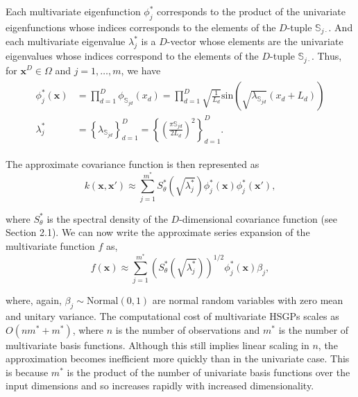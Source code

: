\documentclass[]{interact}
\theoremstyle{plain}%
\theoremstyle{definition}
\theoremstyle{remark}
\begin{document}
Each multivariate eigenfunction $\phi^{\ast}_j$ corresponds to the product of the univariate eigenfunctions whose indices corresponds to the elements of the $D$-tuple $\mathbb{S}_{j\cdotp}$. And each multivariate eigenvalue $\lambda^{\ast}_j$ is a $D$-vector whose elements are the univariate eigenvalues whose indices correspond to the elements of the $D$-tuple $\mathbb{S}_{j\cdotp}$. Thus, for $\mathbf{x}^D \in \Omega$ and $j=1,\ldots,m$, we have 
%
\begin{align} \label{bf&lambda_multi}
\begin{split}
\phi^{\ast}_j(\mathbf{x}) &= \prod_{d=1}^{D} \phi_{\mathbb{S}_{jd}}(x_d) = \prod_{d=1}^{D} \sqrt{\frac{1}{L_d}} \text{sin}\left(\sqrt{\lambda_{\mathbb{S}_{jd}}}(x_d+L_d)\right) \\
%
\lambda^{\ast}_j &= \left\{ \lambda_{\mathbb{S}_{jd}} \right\}_{d=1}^D =  \left\{ \left(\tfrac{\pi \mathbb{S}_{jd}}{2L_d}\right)^2 \right\}_{d=1}^D. 
\end{split}
\end{align}

\noindent The approximate covariance function is then represented as
%
\begin{equation}\label{approxcov_multi}
k(\mathbf{x},\mathbf{x}') \approx \sum_{j=1}^{m^{\ast}} 
S^{\ast}_{\theta}\left(\sqrt{\lambda^{\ast}_j}\right)
\phi^{\ast}_j(\mathbf{x}) \phi^{\ast}_j(\mathbf{x}'),
\end{equation}

\noindent where $S^{\ast}_{\theta}$ is the spectral density of the $D$-dimensional covariance function (see Section 2.1). We can now write the approximate series expansion of the multivariate function $f$ as,
%
\begin{equation}\label{approxf}
f(\mathbf{x}) \approx \sum_{j=1}^{m^{\ast}} 
\left( S^{\ast}_{\theta} \left(\sqrt{\lambda^{\ast}_j} \right)\right)^{1/2}
\phi^{\ast}_j(\mathbf{x}) \beta_j, 
\end{equation}

\noindent where, again, $\beta_j \sim \text{Normal}(0,1)$ are normal random variables with zero mean and unitary variance. The computational cost of multivariate HSGPs scales as $O(n m^{\ast} + m^{\ast})$, where $n$ is the number of observations and $m^{\ast}$ is the number of multivariate basis functions. Although this still implies linear scaling in $n$, the approximation becomes inefficient more quickly than in the univariate case. This is because $m^{\ast}$ is the product of the number of univariate basis functions over the input dimensions and so increases rapidly with increased dimensionality.
\end{document}
